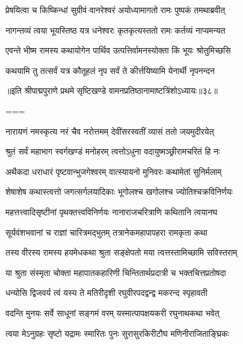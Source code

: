 \twolineshloka
{प्रेषयित्वा च किष्किन्धां सुग्रीवं वानरेश्वरं}
{अयोध्यामागतो रामः पुष्पकं तमथाब्रवीत्}%

\twolineshloka
{नागन्तव्यं त्वया भूयस्तिष्ठ यत्र धनेश्वरः}
{कृतकृत्यस्ततो रामः कर्तव्यं नाप्यमन्यत}%


\twolineshloka
{एवन्ते भीष्म रामस्य कथायोगेन पार्थिव}
{उत्पत्तिर्वामनस्योक्ता किं भूयः श्रोतुमिच्छसि}%

\twolineshloka
{कथयामि तु तत्सर्वं यत्र कौतूहलं नृप}
{सर्वं ते कीर्त्तयिष्यामि येनार्थी नृपनन्दन}%

॥इति श्रीपाद्मपुराणे प्रथमे सृष्टिखण्डे वामनप्रतिष्ठानामाष्टत्रिंशोऽध्यायः॥३८॥


===



\twolineshloka
{नारायणं नमस्कृत्य नरं चैव नरोत्तमम्}
{देवींसरस्वतीं व्यासं ततो जयमुदीरयेत्}%


\twolineshloka
{श्रुतं सर्वं महाभाग स्वर्गखण्डं मनोहरम्}
{त्वत्तोऽधुना वदायुष्मञ्छ्रीरामचरितं हि नः}%


\twolineshloka
{अथैकदा धराधारं पृष्टवान्भुजगेश्वरम्}
{वात्स्यायनो मुनिवरः कथामेतां सुनिर्मलाम्}%


\twolineshloka
{शेषाशेष कथास्त्वत्तो जगत्सर्गलयादिकाः}
{भूगोलश्च खगोलश्च ज्योतिश्चक्रविनिर्णयः}%

\twolineshloka
{महत्तत्त्वादिसृष्टीनां पृथक्तत्त्वविनिर्णयः}
{नानाराजचरित्राणि कथितानि त्वयानघ}%

\twolineshloka
{सूर्यवंशभवानां च राज्ञां चारित्रमद्भुतम्}
{तत्रानेकमहापापहरा रामकृता कथा}%

\twolineshloka
{तस्य वीरस्य रामस्य हयमेधकथा श्रुता}
{सङ्क्षेपतो मया त्वत्तस्तामिच्छामि सविस्तराम्}%

\twolineshloka
{या श्रुता संस्मृता चोक्ता महापातकहारिणी}
{चिन्तितार्थप्रदात्री च भक्तचित्तप्रतोषदा}%


\twolineshloka
{धन्योसि द्विजवर्य त्वं यस्य ते मतिरीदृशी}
{रघुवीरपदद्वन्द्व मकरन्द स्पृहावती}%

\twolineshloka
{वदन्ति मुनयः सर्वे साधूनां सङ्गमं वरम्}
{यस्मात्पापक्षयकरी रघुनाथकथा भवेत्}%

\twolineshloka
{त्वया मेऽनुग्रहः सृष्टो यद्रामः स्मारितः पुनः}
{सुरासुरकिरीटौघ मणिनीराजिताङ्घ्रिकः}%

